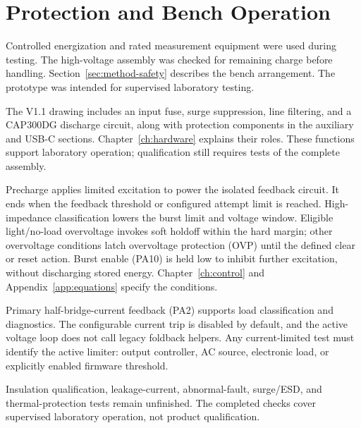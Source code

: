 \section{Protection and Bench Operation}
\label{sec:req-safety}

Controlled energization and rated measurement equipment were used during testing. The high-voltage assembly was checked for remaining charge before handling. Section~\ref{sec:method-safety} describes the bench arrangement. The prototype was intended for supervised laboratory testing.

The V1.1 drawing includes an input fuse, surge suppression, line filtering, and a CAP300DG discharge circuit, along with protection components in the auxiliary and USB-C sections. Chapter~\ref{ch:hardware} explains their roles. These functions support laboratory operation; qualification still requires tests of the complete assembly.

Precharge applies limited excitation to power the isolated feedback circuit. It ends when the feedback threshold or configured attempt limit is reached. High-impedance classification lowers the burst limit and voltage window. Eligible light/no-load overvoltage invokes soft holdoff within the hard margin; other overvoltage conditions latch overvoltage protection (OVP) until the defined clear or reset action. Burst enable (PA10) is held low to inhibit further excitation, without discharging stored energy. Chapter~\ref{ch:control} and Appendix~\ref{app:equations} specify the conditions.

Primary half-bridge-current feedback (PA2) supports load classification and diagnostics. The configurable current trip is disabled by default, and the active voltage loop does not call legacy foldback helpers. Any current-limited test must identify the active limiter: output controller, AC source, electronic load, or explicitly enabled firmware threshold.

Insulation qualification, leakage-current, abnormal-fault, surge/ESD, and thermal-protection tests remain unfinished. The completed checks cover supervised laboratory operation, not product qualification.
